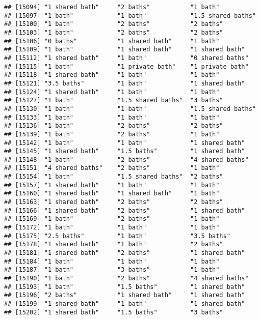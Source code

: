 \documentclass[
]{article}
\begin{document}
\begin{verbatim}
## [15094] "1 shared bath"     "2 baths"           "1 bath"           
## [15097] "1 bath"            "1 bath"            "1.5 shared baths" 
## [15100] "1 bath"            "2 baths"           "2 baths"          
## [15103] "1 bath"            "2 baths"           "2 baths"          
## [15106] "0 baths"           "1 shared bath"     "1 bath"           
## [15109] "1 bath"            "1 shared bath"     "1 shared bath"    
## [15112] "1 shared bath"     "1 bath"            "0 shared baths"   
## [15115] "1 bath"            "1 private bath"    "1 private bath"   
## [15118] "1 shared bath"     "1 bath"            "1 bath"           
## [15121] "3.5 baths"         "1 bath"            "1 shared bath"    
## [15124] "1 shared bath"     "1 bath"            "1 bath"           
## [15127] "1 bath"            "1.5 shared baths"  "3 baths"          
## [15130] "1 bath"            "1 bath"            "1.5 shared baths" 
## [15133] "1 bath"            "1 bath"            "1 bath"           
## [15136] "1 bath"            "2 baths"           "2 baths"          
## [15139] "1 bath"            "2 baths"           "1 bath"           
## [15142] "1 bath"            "1 bath"            "1 shared bath"    
## [15145] "1 shared bath"     "1.5 baths"         "1 shared bath"    
## [15148] "1 bath"            "2 baths"           "4 shared baths"   
## [15151] "4 shared baths"    "2 baths"           "1 bath"           
## [15154] "1 bath"            "1.5 shared baths"  "2 baths"          
## [15157] "1 shared bath"     "1 bath"            "1 bath"           
## [15160] "1 shared bath"     "1 shared bath"     "1 bath"           
## [15163] "1 shared bath"     "2 baths"           "2 baths"          
## [15166] "1 shared bath"     "2 baths"           "1 shared bath"    
## [15169] "1 bath"            "2 baths"           "1 bath"           
## [15172] "1 bath"            "1 bath"            "1 bath"           
## [15175] "2.5 baths"         "1 bath"            "3.5 baths"        
## [15178] "1 shared bath"     "1 bath"            "2 baths"          
## [15181] "1 shared bath"     "2 baths"           "1 shared bath"    
## [15184] "1 bath"            "1 bath"            "1 bath"           
## [15187] "1 bath"            "3 baths"           "1 bath"           
## [15190] "1 bath"            "2 baths"           "4 shared baths"   
## [15193] "1 bath"            "1.5 baths"         "1 shared bath"    
## [15196] "2 baths"           "1 shared bath"     "1 shared bath"    
## [15199] "1 shared bath"     "1 bath"            "1 shared bath"    
## [15202] "1 shared bath"     "1.5 baths"         "3 baths"          

\end{verbatim}
\end{document}
